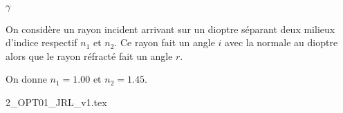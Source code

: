 	\begin{enonce}
		$\gamma$ 
	\end{enonce}
	
	
	\finEntrainement
	
	
	
	
	\newpage
	
	
	
	
	
	\hauteurLargeurCadreReponse		{8mm}{5cm}
	\initialisationEntrainement
	
	
	\initialisationPartieGauche %
	On considère un rayon incident arrivant sur un dioptre séparant deux milieux d'indice respectif $n_1$ et $n_2$. Ce rayon fait un angle $i$ avec la normale au dioptre alors que le rayon réfracté fait un angle $r$. 
	
	
	On donne $n_1=\num{1.00}$ et $n_2=\num{1.45}$.
	
	
	\initialisationPartieDroite %
	\begin{center}
		{2_OPT01_JRL_v1.tex}
	\end{center}
	\finalisationDuPartageDePage %
	
